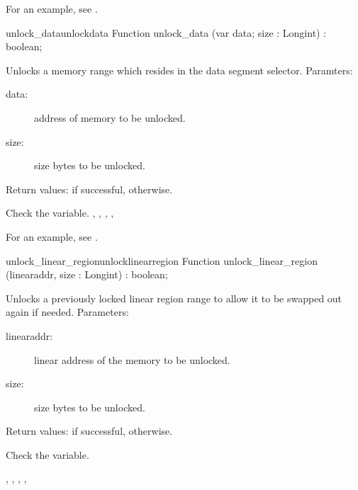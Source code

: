For an example, see .
\begin{functionl}{unlock\_data}{unlockdata}
\Declaration
Function unlock\_data (var data; size : Longint) : boolean;

\Description
Unlocks a memory range which resides in the data segment selector.
Paramters:
\begin{description}
\item[data:\ ] address of memory to be unlocked. 
\item[size:\ ] size bytes to be unlocked.
\end{description}
Return values:  if successful,  otherwise.

\Errors
 Check the  variable.
\SeeAlso
{},
,
,
,
\end{functionl}
For an example, see .
\begin{functionl}{unlock\_linear\_region}{unlocklinearregion}
\Declaration
Function unlock\_linear\_region (linearaddr, size : Longint) : boolean;

\Description
Unlocks a previously locked linear region range to allow it to be swapped
out again if needed.
Parameters:
\begin{description}
\item[linearaddr:\ ] linear address of the memory to be unlocked. 
\item[size:\ ] size bytes to be unlocked.
\end{description}
Return values:  if successful,  otherwise.

\Errors
 Check the  variable.
\SeeAlso

,
,
,
,
\end{functionl}

